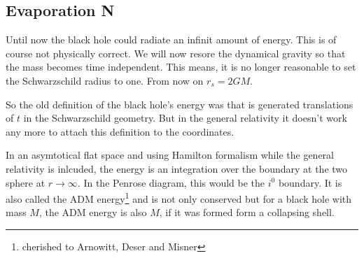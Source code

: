 \subsection{Evaporation N}
	Until now the black hole could radiate an infinit amount of energy. This is of course not physically correct. We will now resore the dynamical gravity so that the mass becomes time independent. This means, it is no longer reasonable to set the Schwarzschild radius to one. From now on $r_s= 2GM$.	
	
	So the old definition of the black hole's energy was that is generated translations of $t$ in the Schwarzschild geometry. But in the general relativity it doesn't work any more to attach this definition to the coordinates.
	
	In an asymtotical flat space and using Hamilton formalism while the general relativity is inlcuded, the energy is an integration over the boundary at the two sphere at $r\rightarrow \infty$. In the Penrose diagram, this would be the $i^0$ boundary. It is also called the ADM energy\footnote{cherished to Arnowitt, Deser and Misner} and is not only conserved but for a black hole with mass $M$, the ADM energy is also $M$, if it was formed form a collapsing shell. 
	
